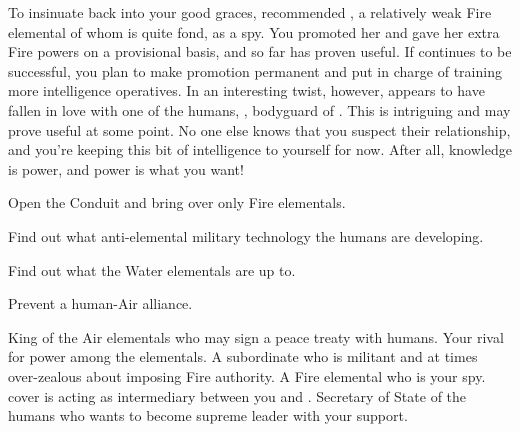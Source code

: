 \documentclass[char]{elementals}
\begin{document}
 To insinuate \cPyro{\themself} back into your good graces, \cPyro{} recommended \cJuliet{\intro}, a relatively weak Fire elemental of whom \cPyro{} is quite fond, as a spy.  You promoted her and gave her extra Fire powers on a provisional basis, and so far \cJuliet{\they} has proven useful.  If \cJuliet{\they} continues to be successful, you plan to make \cJuliet{\their} promotion permanent and put \cJuliet{\their} in charge of training more intelligence operatives.  In an interesting twist, however, \cJuliet{} appears to have fallen in love with one of the humans, \cRomeo{\intro}, bodyguard of \cLeader{}.  This is intriguing and may prove useful at some point.  No one else knows that you suspect their relationship, and you're keeping this bit of intelligence to yourself for now.  After all, knowledge is power, and power is what you want!




\begin{itemz}[Goals]
  \item Open the Conduit and bring over only Fire elementals.
  \item Find out what anti-elemental military technology the humans are developing.
  \item Find out what the Water elementals are up to.
  \item Prevent a human-Air alliance.
\end{itemz}

\begin{contacts}
  \contact{\cKing{}} King of the Air elementals who may sign a peace treaty with humans.  Your rival for power among the elementals.
  \contact{\cPyro{}} A subordinate who is militant and at times over-zealous about imposing Fire authority.
  \contact{\cJuliet{}} A Fire elemental who is your spy.  \cJuliet{\Their} cover is acting as intermediary between you and \cKing{}.
  \contact{\cDema{}} Secretary of State of the humans who wants to become supreme leader with your support.
\end{contacts}
\end{document}
